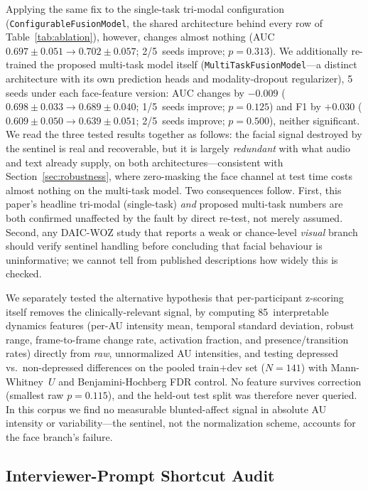 \documentclass[journal]{IEEEtran}
\begin{document}
Applying the same fix to the single-task tri-modal configuration
(\texttt{ConfigurableFusionModel}, the shared architecture behind every
row of Table~\ref{tab:ablation}), however, changes almost nothing
(AUC~$0.697\pm0.051 \to 0.702\pm0.057$; 2/5~seeds improve; $p{=}0.313$).
We additionally re-trained the proposed multi-task model itself
(\texttt{MultiTaskFusionModel}---a distinct architecture with its own
prediction heads and modality-dropout regularizer), 5 seeds under each
face-feature version: AUC changes by $-0.009$ ($0.698\pm0.033 \to
0.689\pm0.040$; 1/5~seeds improve; $p{=}0.125$) and F1 by $+0.030$
($0.609\pm0.050 \to 0.639\pm0.051$; 2/5~seeds improve; $p{=}0.500$),
neither significant. We read the three tested results together as
follows: the facial signal destroyed by the sentinel is real and
recoverable, but it is largely \emph{redundant} with what audio and
text already supply, on both architectures---consistent with
Section~\ref{sec:robustness}, where zero-masking the face channel at
test time costs almost nothing on the multi-task model. Two
consequences follow. First, this paper's headline tri-modal
(single-task) \emph{and} proposed multi-task numbers are both
confirmed unaffected by the fault by direct re-test, not merely
assumed. Second, any DAIC-WOZ study that reports a weak or
chance-level \emph{visual} branch should verify sentinel handling
before concluding that facial behaviour is uninformative; we cannot
tell from published descriptions how widely this is checked.

We separately tested the alternative hypothesis that per-participant
z-scoring itself removes the clinically-relevant signal, by computing
85~interpretable dynamics features (per-AU intensity mean, temporal
standard deviation, robust range, frame-to-frame change rate, activation
fraction, and presence/transition rates) directly from \emph{raw},
unnormalized AU intensities, and testing depressed vs.\ non-depressed
differences on the pooled train$+$dev set ($N{=}141$) with
Mann-Whitney~$U$ and Benjamini-Hochberg FDR control. No feature survives
correction (smallest raw $p{=}0.115$), and the held-out test split was
therefore never queried. In this corpus we find no measurable
blunted-affect signal in absolute AU intensity or variability---the
sentinel, not the normalization scheme, accounts for the face branch's
failure.

\subsection{Interviewer-Prompt Shortcut Audit}
\label{sec:shortcut}
\end{document}
